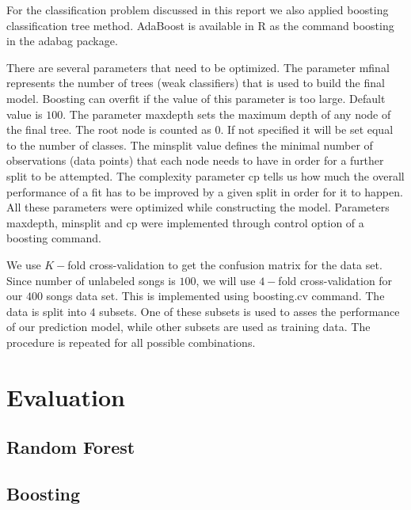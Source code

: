 \documentclass{article}
\begin{document}
For the classification problem discussed in this report we also applied boosting classification tree method. AdaBoost is available in R as the command {\selectfont boosting} in the {\selectfont adabag} package.

There are several parameters that need to be optimized. The parameter {\selectfont mfinal} represents the number of trees (weak classifiers) that is used to build the final model. Boosting can overfit if the value of this parameter is too large. Default value is $100$. The parameter {\selectfont maxdepth} sets the maximum depth of any node of the final tree. The root node is counted as $0$. If not specified it will be set equal to the number of classes. The {\selectfont minsplit} value defines the minimal number of observations (data points) that each node needs to have in order for a further split to be attempted. The complexity parameter {\selectfont cp} tells us how much the overall performance of a fit has to be improved by a given split in order for it to happen. All these parameters were optimized while constructing the model. Parameters {\selectfont maxdepth}, {\selectfont minsplit} and {\selectfont cp} were implemented through {\selectfont control} option of a {\selectfont boosting} command.

We use $K-$fold cross-validation to get the confusion matrix for the data set. Since number of unlabeled songs is $100$, we will use $4-$fold cross-validation for our $400$ songs data set. This is implemented using {\selectfont boosting.cv} command. The data is split into $4$ subsets. One of these subsets is used to asses the performance of our prediction model, while other subsets are used as training data. The procedure is repeated for all possible combinations.

\section{Evaluation}

\subsection{Random Forest}

\subsection{Boosting}
\end{document}
